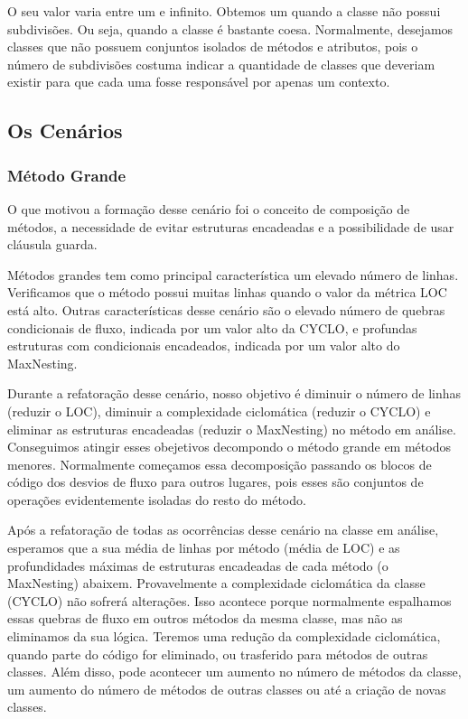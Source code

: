 	O seu valor varia entre um e infinito. Obtemos um quando a classe não possui subdivisões. Ou seja, quando a classe é bastante coesa. Normalmente, desejamos classes que não possuem conjuntos isolados de métodos e atributos, pois o número de subdivisões costuma indicar a quantidade de classes que deveriam existir para que cada uma fosse responsável por apenas um contexto.
	     

	  

\subsection{Os Cenários}

\subsubsection{Método Grande}
	
	O que motivou a formação desse cenário foi o conceito de composição de métodos, a necessidade de evitar estruturas encadeadas e a possibilidade de usar cláusula guarda.
	
	Métodos grandes tem como principal característica um elevado número de linhas. Verificamos que o método possui muitas linhas quando o valor da métrica LOC está alto. Outras características desse cenário são o elevado número de quebras condicionais de fluxo, indicada por um valor alto da CYCLO, e profundas estruturas com condicionais encadeados, indicada por um valor alto do MaxNesting. 
	
	Durante a refatoração desse cenário, nosso objetivo é diminuir o número de linhas (reduzir o LOC), diminuir a complexidade ciclomática (reduzir o CYCLO) e eliminar as estruturas encadeadas (reduzir o MaxNesting) no método em análise. Conseguimos atingir esses obejetivos decompondo o método grande em métodos menores. Normalmente começamos essa decomposição passando os blocos de código dos desvios de fluxo para outros lugares, pois esses são conjuntos de operações evidentemente isoladas do resto do método.
	
	Após a refatoração de todas as ocorrências desse cenário na classe em análise, esperamos que a sua média de linhas por método (média de LOC) e as profundidades máximas de estruturas encadeadas de cada método (o MaxNesting) abaixem. Provavelmente a complexidade ciclomática da classe (CYCLO) não sofrerá alterações. Isso acontece porque normalmente espalhamos essas quebras de fluxo em outros métodos da mesma classe, mas não as eliminamos da sua lógica. Teremos uma redução da complexidade ciclomática, quando parte do código for eliminado, ou trasferido para métodos de outras classes. Além disso, pode acontecer um aumento no número de métodos da classe, um aumento do número de métodos de outras classes ou até a criação de novas classes.
	
